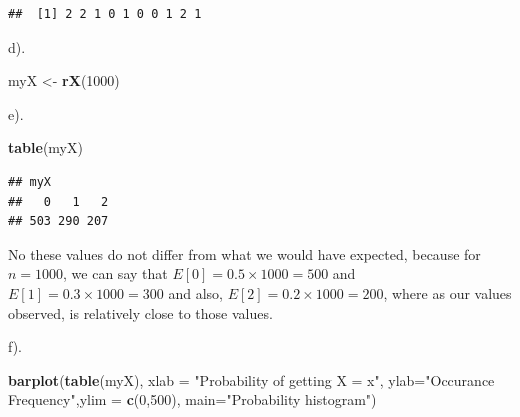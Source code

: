 \documentclass[
]{article}
\newenvironment{Shaded}{\begin{snugshade}}{\end{snugshade}}
\newcommand{\AttributeTok}[1]{\textcolor[rgb]{0.13,0.29,0.53}{#1}}
\newcommand{\DecValTok}[1]{\textcolor[rgb]{0.00,0.00,0.81}{#1}}
\newcommand{\FunctionTok}[1]{\textcolor[rgb]{0.13,0.29,0.53}{\textbf{#1}}}
\newcommand{\NormalTok}[1]{#1}
\newcommand{\OtherTok}[1]{\textcolor[rgb]{0.56,0.35,0.01}{#1}}
\newcommand{\StringTok}[1]{\textcolor[rgb]{0.31,0.60,0.02}{#1}}
\begin{document}
\begin{verbatim}
##  [1] 2 2 1 0 1 0 0 1 2 1
\end{verbatim}

d).

\begin{Shaded}
\begin{Highlighting}[]
\NormalTok{myX }\OtherTok{\textless{}{-}} \FunctionTok{rX}\NormalTok{(}\DecValTok{1000}\NormalTok{)}
\end{Highlighting}
\end{Shaded}

e).

\begin{Shaded}
\begin{Highlighting}[]
\FunctionTok{table}\NormalTok{(myX)}
\end{Highlighting}
\end{Shaded}

\begin{verbatim}
## myX
##   0   1   2 
## 503 290 207
\end{verbatim}

No these values do not differ from what we would have expected, because
for \(n = 1000\), we can say that \(E[0] = 0.5 \times 1000 = 500\) and
\(E[1] = 0.3 \times 1000 = 300\) and also,
\(E[2] = 0.2 \times 1000 = 200\), where as our values observed, is
relatively close to those values.

f).

\begin{Shaded}
\begin{Highlighting}[]
\FunctionTok{barplot}\NormalTok{(}\FunctionTok{table}\NormalTok{(myX), }\AttributeTok{xlab =} \StringTok{"Probability of getting X = x"}\NormalTok{, }\AttributeTok{ylab=}\StringTok{"Occurance Frequency"}\NormalTok{,}\AttributeTok{ylim =} \FunctionTok{c}\NormalTok{(}\DecValTok{0}\NormalTok{,}\DecValTok{500}\NormalTok{), }\AttributeTok{main=}\StringTok{"Probability histogram"}\NormalTok{)}
\end{Highlighting}
\end{Shaded}
\end{document}
